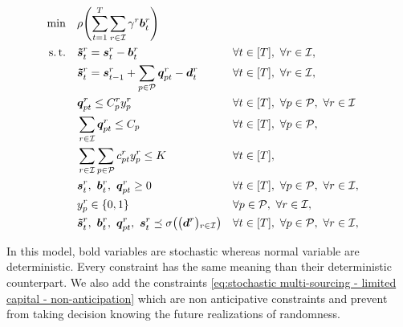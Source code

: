 \begin{subequations}\label{eq:stochastic multi-sourcing - limited capital}
  \begin{align}
    \min\quad & \rlap{$\ds \rho\bracket{\sum_{t=1}^{\horizon} \sum_{r\in\REF} \backorder^r \va\backlog_t^r}$}
    \label{eq:stochastic multi-sourcing - limited capital - objective}
    \\
    \st\quad & \ds \va\level_t^r = \va\inventory_t^r - \va\backlog_t^r && \forall t\in\range{\horizon},\ \forall r\in\REF,
    \label{eq:stochastic multi-sourcing - limited capital - inventory}
    \\
    & \ds \va\level_t^r = \va\inventory_{t-1}^r + \sum_{p\in\plants}\va\quantity_{pt}^r - \va\demand_t^r && \forall t\in\range{\horizon},\ \forall r\in\REF,
    \label{eq:stochastic multi-sourcing - limited capital - dynamic}
    \\
    & \ds \va\quantity_{pt}^r \le \capacity_p^r \open_p^r && \forall t\in\range{\horizon},\ \forall p\in\plants,\ \forall r\in\REF
    \label{eq:stochastic multi-sourcing - limited capital - big M}
    \\
    & \ds \sum_{r\in\REF}\va\quantity_{pt}^r \le \capacity_p && \forall t\in\range{\horizon},\ \forall p\in\plants,
    \label{eq:stochastic multi-sourcing - limited capital - capacity}
    \\
    & \ds \sum_{r\in\REF} \sum_{p\in\plants}\affect_{pt}^r\open_p^r \le \capital && \forall t\in\range{\horizon},
    \label{eq:stochastic multi-sourcing - limited capital - capital}
    \\
    & \ds \va\inventory_t^r,\ \va\backlog_t^r,\ \va\quantity_{pt}^r \ge 0 && \forall t\in\range{\horizon},\ \forall p\in\plants,\ \forall r\in\REF,
    \label{eq:stochastic multi-sourcing - limited capital - nonnegativity}
    \\
    & \ds \open_p^r \in \crbracket{0,1} && \forall p\in\plants,\ \forall r\in\REF,
    \label{eq:stochastic multi-sourcing - limited capital - binary}
    \\
    & \ds \va\level_t^r,\ \va\backlog_t^r,\ \va\quantity_{pt}^r,\ \va\inventory_t^r \preceq \Sfield{\bracket{\va\demand^r}_{r\in\REF}} && \forall t\in\range{\horizon},\ \forall p\in\plants,\ \forall r\in\REF,
    \label{eq:stochastic multi-sourcing - limited capital - non-anticipation}
  \end{align}
\end{subequations}

In this model, bold variables are stochastic whereas normal variable are deterministic. Every constraint has the same meaning than their deterministic counterpart. We also add the constraints \eqref{eq:stochastic multi-sourcing - limited capital - non-anticipation} which are non anticipative constraints and prevent from taking decision knowing the future realizations of randomness.


